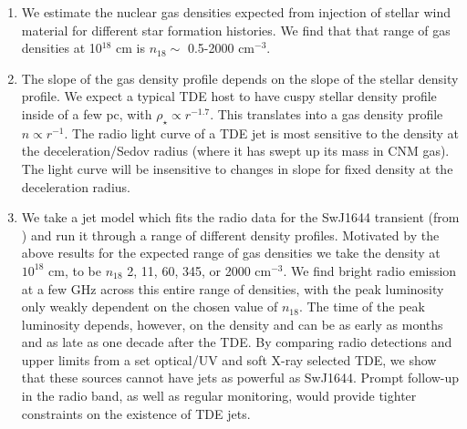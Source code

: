 \documentclass[usenatbib,fleqn]{mnras}
\begin{document}
\begin{enumerate}
\item We estimate the nuclear gas densities expected from injection of
  stellar wind material for different star formation histories. We
  find that that range of gas densities at 10$^{18}$ cm is $n_{18}
  \sim$ 0.5-2000 cm$^{-3}$.

\item The slope of the gas density profile depends on the slope of the
  stellar density profile. We expect a typical TDE host to have cuspy
  stellar density profile inside of a few pc, with $\rho_\star
  \propto r^{-1.7}$. This translates into a gas density profile $n
  \propto r^{-1}$. The radio light curve of a TDE jet is most
  sensitive to the density at the deceleration/Sedov radius (where it
  has swept up its mass in CNM gas). The light curve will be
  insensitive to changes in slope for fixed density at the
  deceleration radius.

\item We take a jet model which fits the radio data for the SwJ1644
  transient (from \citealt{Mimica+2015}) and run it through a range of
  different density profiles. Motivated by the above results for the
  expected range of gas densities we take the density at $10^{18}$ cm,
  to be $n_{18}$ 2, 11, 60, 345, or 2000 cm$^{-3}$. We find bright
  radio emission at a few GHz across this entire range of densities,
  with the peak luminosity only weakly dependent on the chosen value
  of $n_{18}$. The time of the peak luminosity depends, however, on
  the density and can be as early as months and as late as one decade
  after the TDE. By comparing radio detections and upper limits from a
  set optical/UV and soft X-ray selected TDE, we show that these
  sources cannot have jets as powerful as SwJ1644. Prompt follow-up in
  the radio band, as well as regular monitoring, would provide tighter
  constraints on the existence of TDE jets.
\end{enumerate}

\appendix
\end{document}
